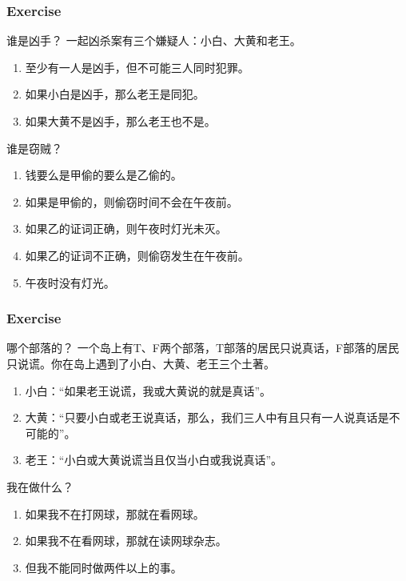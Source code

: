 \documentclass[UTF8,11pt,colorlinks,compress,openany]{beamer}%
\begin{document}
\begin{frame}\frametitle{Exercise}
		\begin{block}{谁是凶手？}
			一起凶杀案有三个嫌疑人：小白、大黄和老王。
			\begin{enumerate}
				\item 至少有一人是凶手，但不可能三人同时犯罪。
				\item 如果小白是凶手，那么老王是同犯。
				\item 如果大黄不是凶手，那么老王也不是。
			\end{enumerate}
		\end{block}
		\begin{block}{谁是窃贼？}
			\begin{enumerate}
				\item 钱要么是甲偷的要么是乙偷的。
				\item 如果是甲偷的，则偷窃时间不会在午夜前。
				\item 如果乙的证词正确，则午夜时灯光未灭。
				\item 如果乙的证词不正确，则偷窃发生在午夜前。
				\item 午夜时没有灯光。
			\end{enumerate}
		\end{block}
\end{frame}

\begin{frame}\frametitle{Exercise}
		\begin{block}{哪个部落的？}
		一个岛上有T、F两个部落，T部落的居民只说真话，F部落的居民只说谎。你在岛上遇到了小白、大黄、老王三个土著。
			\begin{enumerate}
				\item 小白：“如果老王说谎，我或大黄说的就是真话”。
				\item 大黄：“只要小白或老王说真话，那么，我们三人中有且只有一人说真话是不可能的”。
				\item 老王：“小白或大黄说谎当且仅当小白或我说真话”。
			\end{enumerate}
		\end{block}
		\begin{block}{我在做什么？}
			\begin{enumerate}
				\item 如果我不在打网球，那就在看网球。
				\item 如果我不在看网球，那就在读网球杂志。
				\item 但我不能同时做两件以上的事。
			\end{enumerate}
		\end{block}
\end{frame}
\end{document}
